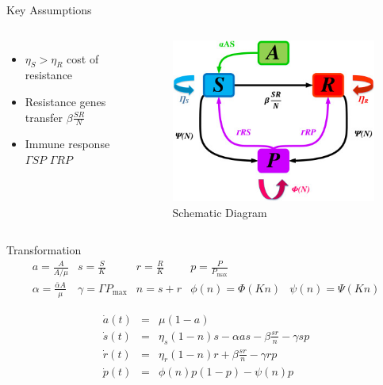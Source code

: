 \documentclass{beamer}
\begin{document}
\begin{frame}{Key Assumptions}
  \begin{columns}
  \begin{itemize}
    \item $\eta_S > \eta_R$ cost of resistance
    \item Resistance genes transfer $\beta\frac{SR}{N}$
    \item Immune response $\Gamma S P$ $\Gamma R P$
  \end{itemize}
    \begin{figure}
        \includegraphics[width=\textwidth]{1-s2.0-S1007570424005975-gr1.jpg}
        \caption{Schematic Diagram}
    \end{figure}
    \end{columns}
\end{frame}


\begin{frame}{Transformation}
\vspace{-20mm}
\[ 
  \begin{array}{ccccc}
    a = \frac{A}{A/\mu} & s = \frac{S}{K} & r = \frac{R}{K} & p = \frac{P}{P_{\max}} & \\
    \alpha = \frac{\bar{\alpha}A}{\mu} & \gamma = \Gamma P_{\max} & n = s + r & \phi(n) = \Phi(Kn) & \psi(n) = \Psi(Kn)
  \end{array}
\]

\vspace{-10mm}

\begin{eqnarray*}
    \dot{a}(t) & = & \mu(1 - a)  \\
    \dot{s}(t) & = & \eta_s(1 - n)s - \alpha as - \beta \frac{sr}{n} - \gamma sp \\
    \dot{r}(t) & = & \eta_r(1 - n)r + \beta \frac{sr}{n} - \gamma rp \\
    \dot{p}(t) & = & \phi(n)p(1 - p) - \psi(n)p 
\end{eqnarray*}

\end{frame}
\end{document}
